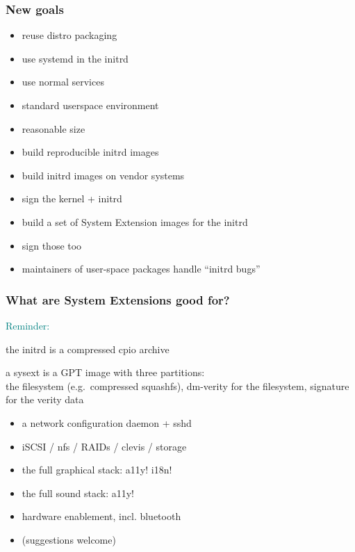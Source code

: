 \documentclass[]{beamer}
\newcommand\pp{}
\begin{document}
\begin{frame}
  \frametitle{New goals}

  \begin{itemize}
    \pp
  \item reuse distro packaging
    \pp
  \item use systemd in the initrd
    \pp
  \item use normal services
    \pp
  \item standard userspace environment
    \pp
  \item reasonable size
    \pp

  \quad

  \item build reproducible initrd images
    \pp
  \item build initrd images on vendor systems
    \pp
  \item sign the kernel + initrd
    \pp
  \item build a set of System Extension images for the initrd
    \pp
  \item sign those too
    \pp

  \quad

  \item maintainers of user-space packages handle ``initrd bugs''
  \end{itemize}
\end{frame}

\begin{frame}
  \frametitle{What are System Extensions good for?}

  \pp
  \textcolor{teal}{Reminder:}{ }\begin{minipage}[t]{0.8\linewidth}
    the initrd is a compressed cpio archive

    \quad

    a sysext is a GPT image with
    three partitions:\\
    the filesystem (e.g.\ compressed squashfs),
    dm-verity for the filesystem,
    signature for the verity data
  \end{minipage}

  \quad

  \begin{itemize}
    \pp
  \item a network configuration daemon + sshd

    \pp
  \item iSCSI / nfs / RAIDs / clevis / storage

    \pp
  \item the full graphical stack\pp: a11y! \pp i18n!

    \pp
  \item the full sound stack\pp: a11y!

    \pp
  \item hardware enablement, incl. bluetooth

    \pp
  \item (suggestions welcome)
  \end{itemize}
\end{frame}
\end{document}
